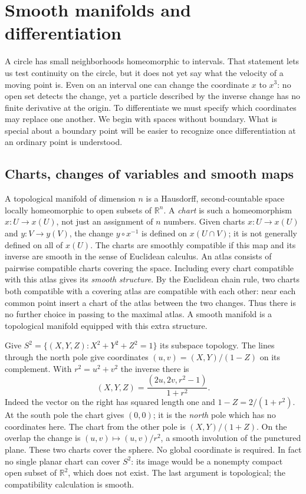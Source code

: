 \chapter{Smooth manifolds and differentiation}\label{f:smooth}
A circle has small neighborhoods homeomorphic to intervals. That statement lets us test continuity on the circle, but it does not yet say what the velocity of a moving point is. Even on an interval one can change the coordinate $x$ to $x^3$: no open set detects the change, yet a particle described by the inverse change has no finite derivative at the origin. To differentiate we must specify which coordinates may replace one another. We begin with spaces without boundary. What is special about a boundary point will be easier to recognize once differentiation at an ordinary point is understood.

\section{Charts, changes of variables and smooth maps}
A topological manifold of dimension $n$ is a Hausdorff, second-countable space locally homeomorphic to open subsets of $\mathbb R^n$. A \emph{chart} is such a homeomorphism $x:U\to x(U)$, not just an assignment of $n$ numbers. Given charts $x:U\to x(U)$ and $y:V\to y(V)$, the change $y\circ x^{-1}$ is defined on $x(U\cap V)$; it is not generally defined on all of $x(U)$. The charts are smoothly compatible if this map and its inverse are smooth in the sense of Euclidean calculus. An atlas consists of pairwise compatible charts covering the space. Including every chart compatible with this atlas gives its \emph{smooth structure}. By the Euclidean chain rule, two charts both compatible with a covering atlas are compatible with each other: near each common point insert a chart of the atlas between the two changes. Thus there is no further choice in passing to the maximal atlas. A smooth manifold is a topological manifold equipped with this extra structure.

\begin{example}\label{f:stereo}
Give $S^2=\{(X,Y,Z):X^2+Y^2+Z^2=1\}$ its subspace topology. The lines through the north pole give coordinates $(u,v)=(X,Y)/(1-Z)$ on its complement. With $r^2=u^2+v^2$ the inverse there is
\[
 (X,Y,Z)=\frac{(2u,2v,r^2-1)}{1+r^2}.
\]
Indeed the vector on the right has squared length one and $1-Z=2/(1+r^2)$. At the south pole the chart gives $(0,0)$; it is the \emph{north} pole which has no coordinates here. The chart from the other pole is $(X,Y)/(1+Z)$. On the overlap the change is $(u,v)\mapsto (u,v)/r^2$, a smooth involution of the punctured plane. These two charts cover the sphere. No global coordinate is required. In fact no single planar chart can cover $S^2$: its image would be a nonempty compact open subset of $\mathbb R^2$, which does not exist. The last argument is topological; the compatibility calculation is smooth.
\end{example}

